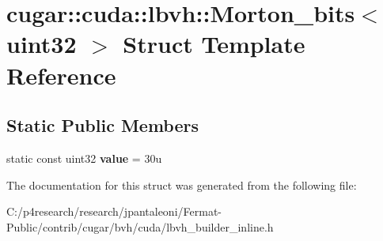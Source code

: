 \hypertarget{structcugar_1_1cuda_1_1lbvh_1_1_morton__bits_3_01uint32_01_4}{}\section{cugar\+:\+:cuda\+:\+:lbvh\+:\+:Morton\+\_\+bits$<$ uint32 $>$ Struct Template Reference}
\label{structcugar_1_1cuda_1_1lbvh_1_1_morton__bits_3_01uint32_01_4}
\subsection*{Static Public Members}
\begin{DoxyCompactItemize}
\item 
\mbox{\label{structcugar_1_1cuda_1_1lbvh_1_1_morton__bits_3_01uint32_01_4_a2c8c2c12ff4e7ffb036b4d2a2273f9c0}} 
static const uint32 {\bfseries value} = 30u
\end{DoxyCompactItemize}


The documentation for this struct was generated from the following file\+:\begin{DoxyCompactItemize}
\item 
C\+:/p4research/research/jpantaleoni/\+Fermat-\/\+Public/contrib/cugar/bvh/cuda/lbvh\+\_\+builder\+\_\+inline.\+h\end{DoxyCompactItemize}
